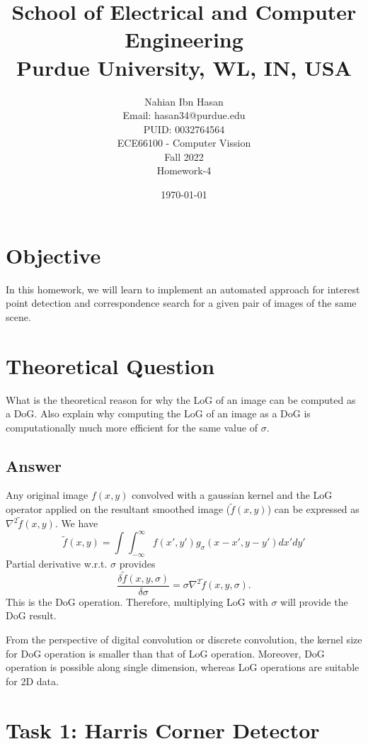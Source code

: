 \documentclass{article}
\title{School of Electrical and Computer Engineering\\
Purdue University, WL, IN, USA}
\author{Nahian Ibn Hasan\\
Email: hasan34@purdue.edu\\
PUID: 0032764564\\
ECE66100 - Computer Vission\\
Fall 2022\\
Homework-4}
\date{\today}
\begin{document}
\maketitle
\section{Objective}
In this homework, we will learn to implement an automated approach for interest point detection and correspondence search for a given pair of images of the same scene.
\section{Theoretical Question}
What is the theoretical reason for why the LoG of an image can be computed as a DoG. Also explain why computing the LoG of an image as a DoG is computationally much more efficient for the same value of $\sigma$.
\subsection{Answer}
Any original image $f(x,y)$ convolved with a gaussian kernel and the LoG operator applied on the resultant smoothed image ($\tilde{f}(x,y)$) can be expressed as $\nabla^2\tilde{f}(x,y)$. We have
\begin{equation}
	\tilde{f}(x,y) = \int_{}^{}\int_{-\infty}^{\infty}f(x',y')g_\sigma(x-x',y-y')dx'dy'
\end{equation}
Partial derivative w.r.t. $\sigma$ provides
\begin{equation}
	\frac{\delta\tilde{f}(x,y,\sigma)}{\delta\sigma} = \sigma\nabla^2\tilde{f}(x,y,\sigma).
\end{equation}
This is the DoG operation. Therefore, multiplying LoG with $\sigma$ will provide the DoG result.
\par From the perspective of digital convolution or discrete convolution, the kernel size for DoG operation is smaller than that of LoG operation. Moreover, DoG operation is possible along single dimension, whereas LoG operations are suitable for 2D data.

\section{Task 1: Harris Corner Detector}
\end{document}
